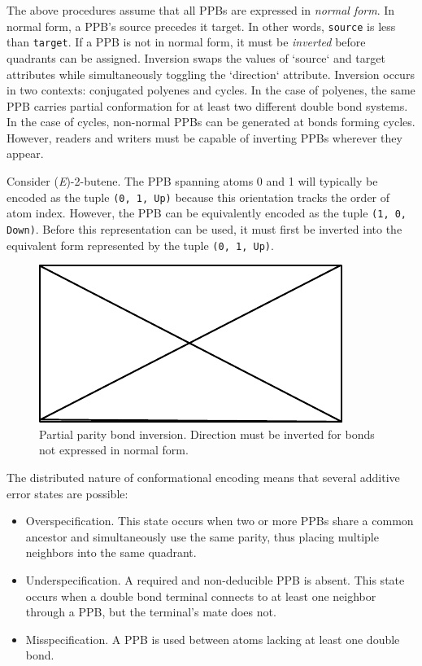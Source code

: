 \documentclass{article}
\def\ttt{\texttt}
\begin{document}
The above procedures assume that all PPBs are expressed in \textit{normal form}. In normal form, a PPB's source precedes it target. In other words, \ttt{source} is less than \ttt{target}. If a PPB is not in normal form, it must be \textit{inverted} before quadrants can be assigned. Inversion swaps the values of `source` and target attributes while simultaneously toggling the `direction` attribute. Inversion occurs in two contexts: conjugated polyenes and cycles. In the case of polyenes, the same PPB carries partial conformation for at least two different double bond systems. In the case of cycles, non-normal PPBs can be generated at bonds forming cycles. However, readers and writers must be capable of inverting PPBs wherever they appear.

Consider (\textit{E})-2-butene. The PPB spanning atoms 0 and 1 will typically be encoded as the tuple \ttt{(0, 1, Up)} because this orientation tracks the order of atom index. However, the PPB can be equivalently encoded as the tuple \ttt{(1, 0, Down)}. Before this representation can be used, it must first be inverted into the equivalent form represented by the tuple \ttt{(0, 1, Up)}.

\begin{figure}
    \centering
    \includegraphics{filler}
    \caption{Partial parity bond inversion. Direction must be inverted for bonds not expressed in normal form.}
    \label{fig:ppb-inversion}
\end{figure}

The distributed nature of conformational encoding means that several additive error states are possible:

\begin{itemize}
    \item{Overspecification. This state occurs when two or more PPBs share a common ancestor and simultaneously use the same parity, thus placing multiple neighbors into the same quadrant.}
    \item{Underspecification. A required and non-deducible PPB is absent. This state occurs when a double bond terminal connects to at least one neighbor through a PPB, but the terminal's mate does not.}
    \item{ Misspecification. A PPB is used between atoms lacking at least one double bond.}
\end{itemize}
\end{document}
